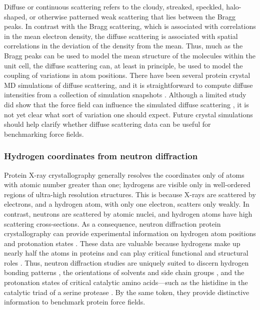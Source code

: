 \documentclass[9pt,review]{livecoms}
\begin{document}
Diffuse or continuous scattering refers to the cloudy, streaked, speckled, halo-shaped, or otherwise patterned weak scattering that lies between the Bragg peaks.
In contrast with the Bragg scattering, which is associated with correlations in the mean electron density, the diffuse scattering is associated with spatial correlations in the deviation of the density from the mean.
Thus, much as the Bragg peaks can be used to model the mean structure of the molecules within the unit cell, the diffuse scattering can, at least in principle, be used to model the coupling of variations in atom positions.
There have been several protein crystal MD simulations of diffuse scattering, and it is straightforward to compute diffuse intensities from a collection of simulation snapshots \cite{faure_correlated_1994,clarage_sampling_1995,hery_x-ray_1998,meinhold_fluctuations_2005,wall_conformational_2014,wall_internal_2018,wych_liquid-like_2019,meisburger_diffuse_2020,meisburger_robust_2023}.
Although a limited study did show that the force field can influence the simulated diffuse scattering \cite{wych_liquid-like_2019}, it is not yet clear what sort of variation one should expect.
Future crystal simulations should help clarify whether diffuse scattering data can be useful for benchmarking force fields.

\subsubsection{Hydrogen coordinates from neutron diffraction}
\label{sub2:neutron}

Protein X-ray crystallography generally resolves the coordinates only of atoms with atomic number greater than one; hydrogens are visible only in well-ordered regions of ultra-high resolution structures.
This is because X-rays are scattered by electrons, and a hydrogen atom, with only one electron, scatters only weakly.
In contrast, neutrons are scattered by atomic nuclei, and hydrogen atoms have high scattering cross-sections.
As a consequence, neutron diffraction protein crystallography can provide experimental information on hydrogen atom positions and protonation states \cite{blakeley_neutron_2009,ashkar_neutron_2018}.
These data are valuable because hydrogens make up nearly half the atoms in proteins and can play critical functional and structural roles \cite{word_asparagine_1999,word_visualizing_1999}.
Thus, neutron diffraction studies are uniquely suited to discern hydrogen bonding patterns \cite{chen_direct_2012,nakamura_newtons_2015}, the orientations of solvents and side chain groups \cite{blakeley_15-k_2004,wall_biomolecular_2019}, and the protonation states of critical catalytic amino acids---such as the histidine in the catalytic triad of a serine protease \cite{kossiakoff_neutron_1980,kossiakoff_direct_1981}.
By the same token, they provide distinctive information to benchmark protein force fields.
\end{document}
